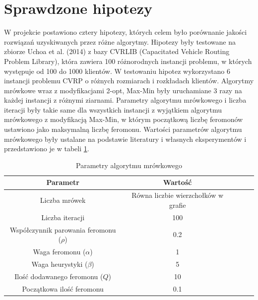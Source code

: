 \documentclass{article}
\begin{document}
\section{Sprawdzone hipotezy}
W projekcie postawiono cztery hipotezy, których celem było porównanie jakości rozwiązań uzyskiwanych przez różne algorytmy. Hipotezy były testowane na zbiorze Uchoa et al. (2014) z bazy CVRLIB (Capacitated Vehicle Routing Problem Library), która zawiera 100 różnorodnych instancji problemu, w których występuje od 100 do 1000 klientów. W testowaniu hipotez wykorzystano 6 instancji problemu CVRP o różnych rozmiarach i rozkładach klientów. Algorytmy mrówkowe wraz z modyfikacjami 2-opt, Max-Min były uruchamiane 3 razy na każdej instancji z różnymi ziarnami. Parametry algorytmu mrówkowego i liczba iteracji były takie same dla wszystkich instancji z wyjątkiem algorytmu mrówkowego z modyfikacją Max-Min, w którym początkową liczbę feromonów ustawiono jako maksymalną liczbę feromonu. Wartości parametrów algorytmu mrówkowego były ustalane na podstawie literatury i własnych eksperymentów i przedstawiono je w tabeli \ref{tab:params}.

\begin{table}[H]
    \label{tab:params}
    \centering
    \begin{tabular}{|c|c|c|c|c|}
        \hline
        \textbf{Parametr} & \textbf{Wartość} \\
        \hline
        Liczba mrówek & Równa liczbie wierzchołków w grafie \\
        \hline
        Liczba iteracji & 100 \\
        \hline
        Współczynnik parowania feromonu ($\rho$) & 0.2 \\
        \hline
        Waga feromonu ($\alpha$) & 1 \\
        \hline
        Waga heurystyki ($\beta$) & 5 \\
        \hline
        Ilość dodawanego feromonu ($Q$) & 10 \\
        \hline
        Początkowa ilość feromonu & 0.1 \\
        \hline
    \end{tabular}
    \caption{Parametry algorytmu mrówkowego}
    \label{tab:params}
\end{table}
\end{document}
